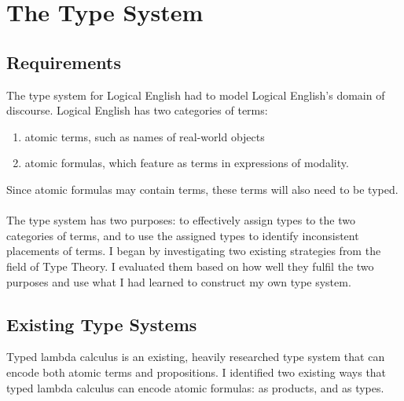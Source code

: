 \documentclass[../main.tex]{subfiles}
\begin{document}
\chapter{The Type System}
\section{Requirements}
The type system for Logical English had to model Logical English's domain of discourse. Logical English has two categories of terms:
\begin{enumerate}
    \item atomic terms, such as names of real-world objects
    \item atomic formulas, which feature as terms in expressions of modality.
\end{enumerate}
Since atomic formulas may contain terms, these terms will also need to be typed.
\\
\\
The type system has two purposes: to effectively assign types to the two categories of terms, and to use the assigned types to identify inconsistent placements of terms. I began by investigating two existing strategies from the field of Type Theory. I evaluated them based on how well they fulfil the two purposes and use what I had learned to construct my own type system.


\section{Existing Type Systems}
Typed lambda calculus is an existing, heavily researched type system that can encode both atomic terms and propositions. I identified two existing ways that typed lambda calculus can encode atomic formulas: as products, and as types.
\end{document}

